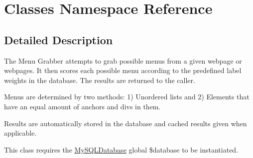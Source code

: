 \hypertarget{namespaceClasses}{\section{Classes Namespace Reference}
\label{namespaceClasses}
}


\subsection{Detailed Description}
The Menu Grabber attempts to grab possible menus from a given webpage or webpages. It then scores each possible menu according to the predefined label weights in the database. The results are returned to the caller.

Menus are determined by two methods\-: 1) Unordered lists and 2) Elements that have an equal amount of anchors and divs in them.

Results are automatically stored in the database and cached results given when applicable.

This class requires the \hyperlink{classMySQLDatabase}{My\-S\-Q\-L\-Database} global \$database to be instantiated. 